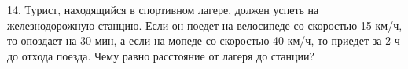14. Турист, находящийся в спортивном лагере, должен успеть на железнодорожную станцию. Если он поедет на велосипеде со скоростью 15 км/ч, то опоздает на 30 мин, а если на мопеде со скоростью 40 км/ч, то приедет за 2 ч до отхода поезда. Чему равно расстояние от лагеря до станции?\\
